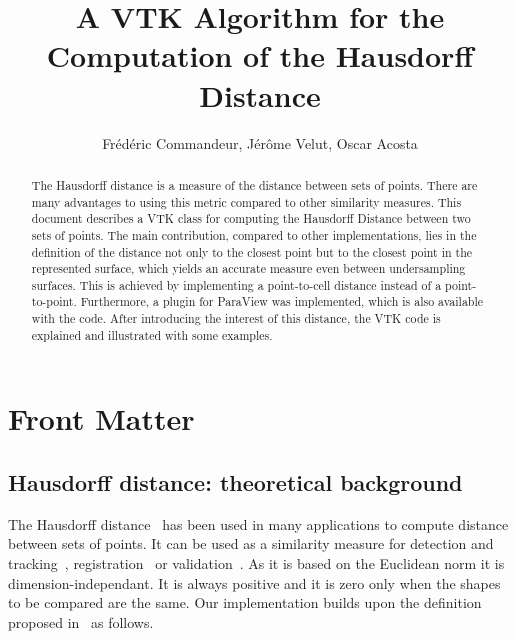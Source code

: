 \documentclass{InsightArticle}
\title{A VTK Algorithm for the Computation of the Hausdorff Distance}
\author{Fr\'{e}d\'{e}ric Commandeur, J\'er\^ome Velut, Oscar Acosta}
\newcommand{\IJhandlerIDnumber}{3251}
\begin{document}
%
% 
\IJhandlefooter{\IJhandlerIDnumber}


\ifpdf
\else
\fi


\maketitle


\ifhtml
\chapter*{Front Matter\label{front}}
\fi


\begin{abstract}
\noindent

The Hausdorff distance is a measure of the distance between sets of points. There are many advantages to using this metric compared to other similarity measures. This document describes a VTK class for computing the Hausdorff Distance between two sets of points. The main contribution, compared to other implementations, lies in the definition of the distance not only to the closest point but to the closest point in the represented surface, which yields an accurate measure even between undersampling surfaces. This is achieved by implementing a point-to-cell distance instead of a point-to-point.  Furthermore, a plugin for ParaView was implemented, which is also available with the code. After introducing the interest of this distance, the VTK code is explained and illustrated with some examples.
%
\end{abstract}

\IJhandlenote{\IJhandlerIDnumber}

\tableofcontents

%
\section{Hausdorff distance: theoretical background}
\label{sec:hausdorff_distance}
The Hausdorff distance~\cite{HAU18.1} has been used in many applications to compute distance between sets of points. It can be used as a similarity measure for detection and tracking~\cite{Gastaldo:2002}, registration~\cite{Zhang:2005} or validation~\cite{Klein2010}. As it is based on the Euclidean norm it is dimension-independant. It is always positive and it is zero only when the shapes to be compared are the same. Our implementation builds upon the definition proposed in~\cite{ASP02} as follows.
%
\end{document}
